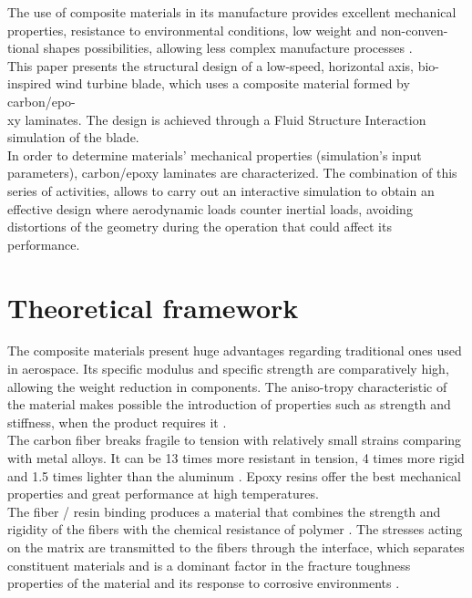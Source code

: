 The use of composite materials in its manufacture provides excellent mechanical properties, resistance to environmental conditions, low weight and non-conven-\\tional shapes possibilities, allowing less complex manufacture processes \cite{Mish}.\\

This paper presents the structural design of a low-speed, horizontal axis, bio-inspired wind turbine blade, which uses a composite material formed by carbon/epo-\\xy laminates. The design is achieved through a Fluid Structure Interaction simulation of the blade.\\ 

In order to determine materials’ mechanical properties (simulation’s input parameters), carbon/epoxy laminates are characterized. The combination of this series of activities, allows to carry out an interactive simulation to obtain an effective design where aerodynamic loads counter inertial loads, avoiding distortions of the geometry during the operation that could affect its performance.  %
\vspace{-0.2cm}
\section{Theoretical framework}
\label{sec:1}
The composite materials present huge advantages regarding traditional ones used in aerospace. Its specific modulus and specific strength are comparatively high, allowing the weight reduction in components. The aniso-tropy characteristic of the material makes possible the introduction of properties such as strength and stiffness, when the product requires it \cite{hull}.\\

The carbon fiber breaks fragile to tension with relatively small strains comparing with metal alloys. It can be 13 times more resistant in tension, 4 times more rigid and 1.5 times lighter than the aluminum \cite{lin}. Epoxy resins offer the best mechanical properties and great performance at high temperatures.\\

The fiber / resin binding produces a material that combines the strength and rigidity of the fibers with the chemical resistance of polymer \cite{hull}. The stresses acting on the matrix are transmitted to the fibers through the interface, which separates constituent materials and is a dominant factor in the fracture toughness properties of the material and its response to corrosive environments \cite{hos}.\\

